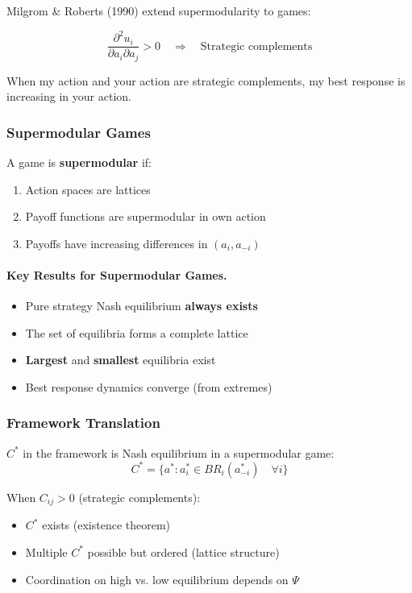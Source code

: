 Milgrom \& Roberts (1990) extend supermodularity to games:

\begin{equation}
\boxed{
\frac{\partial^2 u_i}{\partial a_i \partial a_j} > 0 \quad \Rightarrow \quad 
\text{Strategic complements}
}
\label{eq:mr-strategic}
\end{equation}

When my action and your action are strategic complements, my best response 
is increasing in your action.

\subsubsection{Supermodular Games}

A game is \textbf{supermodular} if:
\begin{enumerate}
    \item Action spaces are lattices
    \item Payoff functions are supermodular in own action
    \item Payoffs have increasing differences in $(a_i, a_{-i})$
\end{enumerate}

\paragraph{Key Results for Supermodular Games.}
\begin{itemize}
    \item Pure strategy Nash equilibrium \textbf{always exists}
    \item The set of equilibria forms a complete lattice
    \item \textbf{Largest} and \textbf{smallest} equilibria exist
    \item Best response dynamics converge (from extremes)
\end{itemize}

\subsubsection{Framework Translation}

$C^*$ in the framework is Nash equilibrium in a supermodular game:
\begin{equation}
C^* = \{a^* : a^*_i \in BR_i(a^*_{-i}) \quad \forall i\}
\end{equation}

When $C_{ij} > 0$ (strategic complements):
\begin{itemize}
    \item $C^*$ exists (existence theorem)
    \item Multiple $C^*$ possible but ordered (lattice structure)
    \item Coordination on high vs. low equilibrium depends on $\Psi$
\end{itemize}

